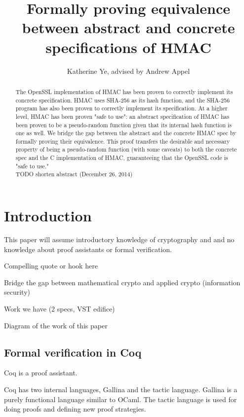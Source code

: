 \documentclass[twocolumn,showpacs,%
  nofootinbib,aps,superscriptaddress,%
  eqsecnum,prd,notitlepage,showkeys,10pt]{revtex4-1}
\begin{document}
\title{Formally proving equivalence between abstract and concrete specifications of HMAC}
\author{Katherine Ye, advised by Andrew Appel}

\begin{abstract}
The OpenSSL implementation of HMAC has been proven to correctly implement its concrete specification. HMAC uses SHA-256 as its hash function, and the SHA-256 program has also been proven to correctly implement its specification. At a higher level, HMAC has been proven "safe to use": an abstract specification of HMAC has been proven to be a pseudo-random function given that its internal hash function is one as well. We bridge the gap between the abstract and the concrete HMAC spec by formally proving their equivalence. This proof transfers the desirable and necessary property of being a pseudo-random function (with some caveats) to both the concrete spec and the C implementation of HMAC, guaranteeing that the OpenSSL code is "safe to use."
\\
TODO shorten abstract (December 26, 2014)

\end{abstract}

\maketitle

\section{Introduction}

This paper will assume introductory knowledge of cryptography and and no knowledge about proof assistants or formal verification.

Compelling quote or hook here

Bridge the gap between mathematical crypto and applied crypto (information security)

Work we have (2 specs, VST edifice)

Diagram of the work of this paper

\subsection{Formal verification in Coq}

Coq is a proof assistant.

Coq has two internal languages, Gallina and the tactic language. Gallina is a purely functional language similar to OCaml. The tactic language is used for doing proofs and defining new proof strategies.
\end{document}
